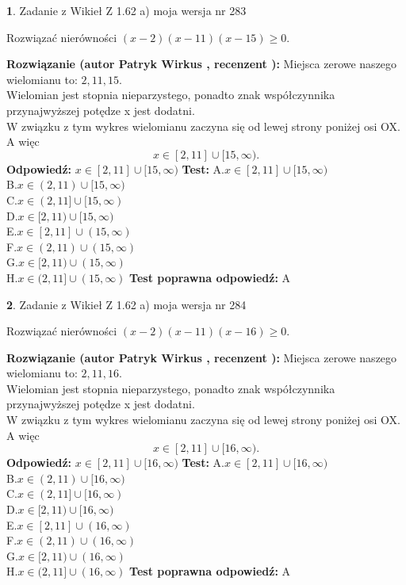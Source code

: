 \documentclass[12pt, a4paper]{article}
\theoremstyle{definition} %
\newtheorem{zad}{}
\newcommand{\zadStart}[1]{\begin{zad}#1\newline}
\newcommand{\zadStop}{\end{zad}}
\newcommand{\rozwStart}[2]{\noindent \textbf{Rozwiązanie (autor #1 , recenzent #2): }\newline}
\newcommand{\rozwStop}{\newline}
\newcommand{\odpStart}{\noindent \textbf{Odpowiedź:}\newline}
\newcommand{\odpStop}{\newline}
\newcommand{\testStart}{\noindent \textbf{Test:}\newline}
\newcommand{\testStop}{\newline}
\newcommand{\kluczStart}{\noindent \textbf{Test poprawna odpowiedź:}\newline}
\newcommand{\kluczStop}{\newline}
\begin{document}
\zadStart{Zadanie z Wikieł Z 1.62 a) moja wersja nr 283}

Rozwiązać nierówności $(x-2)(x-11)(x-15)\ge0$.
\zadStop
\rozwStart{Patryk Wirkus}{}
Miejsca zerowe naszego wielomianu to: $2, 11, 15$.\\
Wielomian jest stopnia nieparzystego, ponadto znak współczynnika przy\linebreak najwyższej potędze x jest dodatni.\\ W związku z tym wykres wielomianu zaczyna się od lewej strony poniżej osi OX. A więc $$x \in [2,11] \cup [15,\infty).$$
\rozwStop
\odpStart
$x \in [2,11] \cup [15,\infty)$
\odpStop
\testStart
A.$x \in [2,11] \cup [15,\infty)$\\
B.$x \in (2,11) \cup [15,\infty)$\\
C.$x \in (2,11] \cup [15,\infty)$\\
D.$x \in [2,11) \cup [15,\infty)$\\
E.$x \in [2,11] \cup (15,\infty)$\\
F.$x \in (2,11) \cup (15,\infty)$\\
G.$x \in [2,11) \cup (15,\infty)$\\
H.$x \in (2,11] \cup (15,\infty)$
\testStop
\kluczStart
A
\kluczStop



\zadStart{Zadanie z Wikieł Z 1.62 a) moja wersja nr 284}

Rozwiązać nierówności $(x-2)(x-11)(x-16)\ge0$.
\zadStop
\rozwStart{Patryk Wirkus}{}
Miejsca zerowe naszego wielomianu to: $2, 11, 16$.\\
Wielomian jest stopnia nieparzystego, ponadto znak współczynnika przy\linebreak najwyższej potędze x jest dodatni.\\ W związku z tym wykres wielomianu zaczyna się od lewej strony poniżej osi OX. A więc $$x \in [2,11] \cup [16,\infty).$$
\rozwStop
\odpStart
$x \in [2,11] \cup [16,\infty)$
\odpStop
\testStart
A.$x \in [2,11] \cup [16,\infty)$\\
B.$x \in (2,11) \cup [16,\infty)$\\
C.$x \in (2,11] \cup [16,\infty)$\\
D.$x \in [2,11) \cup [16,\infty)$\\
E.$x \in [2,11] \cup (16,\infty)$\\
F.$x \in (2,11) \cup (16,\infty)$\\
G.$x \in [2,11) \cup (16,\infty)$\\
H.$x \in (2,11] \cup (16,\infty)$
\testStop
\kluczStart
A
\kluczStop
\end{document}
